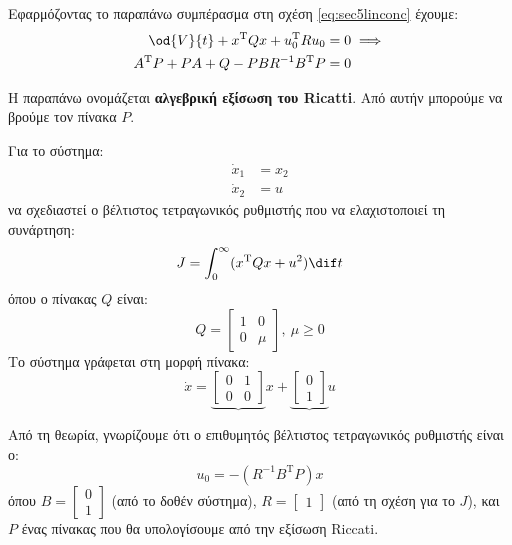 \documentclass[11pt,a4paper,notitlepage,fleqn]{article}
\begin{document}
Εφαρμόζοντας το παραπάνω συμπέρασμα στη σχέση \eqref{eq:sec5linconc} έχουμε:
\begin{align*}
	\od{V}{t} + x^{\mathrm T}Qx + u_0^{\mathrm T} R u_0 &= 0 \implies \\
	A^{\mathrm T}P + PA + Q - PBR^{-1}B^{\mathrm T}P &= 0
\end{align*}

Η παραπάνω ονομάζεται \textbf{αλγεβρική εξίσωση του Ricatti}. Από αυτήν
μπορούμε να βρούμε τον πίνακα \( P \).

\begin{exercise}
	Για το σύστημα:
	\begin{align*}
		\dot x_1 &= x_2 \\
		\dot x_2 &= u
	\end{align*}
	να σχεδιαστεί ο βέλτιστος τετραγωνικός ρυθμιστής που να ελαχιστοποιεί
	τη συνάρτηση:
	\[
	J = \int_{0 }^{\infty} (x^{\mathrm T} Q x +u^2)\dif t
	\]
	όπου ο πίνακας \( Q \) είναι:
	\[
	Q = \left[\begin{matrix}
	1 & 0 \\ 0 & \mu
	\end{matrix}\right], \ \mu \geq 0
	\]
	\tcblower
	Το σύστημα γράφεται στη μορφή πίνακα:
	\[
	\dot x = \underbrace{\left[\begin{matrix}
		0 & 1 \\ 0 & 0
		\end{matrix}\right]}x + \underbrace{\left[\begin{matrix}
		0 \\ 1
		\end{matrix}\right]}u
	\]

	Από τη θεωρία, γνωρίζουμε ότι ο επιθυμητός βέλτιστος τετραγωνικός
	ρυθμιστής είναι ο:
	\[
	u_0 = -(R^{-1}B^{\mathrm T}P)x
	\]
	όπου \( B = \left[\begin{matrix}
	0 \\ 1
	\end{matrix}\right] \) (από το δοθέν σύστημα), \( R = \left[\begin{matrix}
	1
	\end{matrix}\right] \) (από τη σχέση για το \( J \)), και \( P \)
	ένας πίνακας που θα υπολογίσουμε από την εξίσωση Riccati.


\end{exercise}
\end{document}
